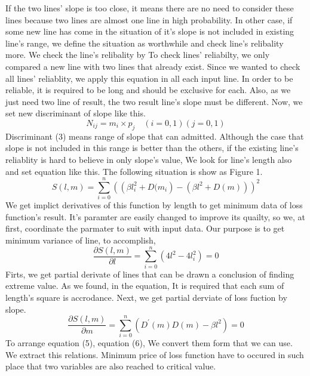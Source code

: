 \newline If the two lines’ slope is too close, it means there are no need to consider these lines because two lines are almost one line in high probability. In other case, if some new line has come in the situation of it's slope is not included in existing line's range, we define the situation as worthwhile and check line's relibality more. We check the line's relibality by To check lines’ reliabilty, we only compared a new line with two lines that already exist. Since we wanted to check all lines’ reliablity, we apply this equation in all each input line. \newline
In order to be reliable, it is required to be long and should be exclusive for each. Also, as we just need two line of result, the two result line's slope must be different. Now, we set new discriminant of slope like this. 
\begin{equation}
{N}_{ij} = {m}_{i} \times {p}_{j} \quad (i=0,1)(j=0,1)
\end{equation}
Discriminant (3) means range of slope that can admitted. Although the case that slope is not included in this range is better than the others, if the existing line's reliablity is hard to believe in only slope's value, We look for line's length also and set equation like this. The following situation is show as Figure 1. 
\begin{equation}
\mathit{S\left(l,m\right) = \sum_{i=0}^{n}{(\left(\beta{l}_{i}^{2} + D({m}_{i}\right) - (\beta{l}^{2} + D\left(m \right)))}^{2}}
\end{equation}
We get implict derivatives of this function by length to get minimum data of loss function's result. It's paramter are easily changed to improve its quailty, so we, at first, coordinate the parmater to suit with input data. Our purpose is to get minimum variance of line, to accomplish,  
\begin{equation}
\mathit{\frac{\partial S\left(l,m\right)}{\partial l} = \sum_{i=0}^{n}{\left(4{l}^{2}-4{{l}_{i}^{2}}\right)} = 0} 
\end{equation}
Firts, we get partial derivate of lines that can be drawn a conclusion of finding extreme value. As we found, in the equation, It is required that each sum of length's square is accrodance. Next, we get partial derviate of loss fuction by slope.
\begin{equation}
\mathit{\frac{\partial S\left(l,m\right)}{\partial m} = \sum_{i=0}^{n}{({D}^{\prime}(m)D(m) - \beta{l}^{2})} = 0}
\end{equation}
To arrange equation (5), equation (6), We convert them form that we can use. We extract this relations. Minimum price of loss function have to occured in such place that two variables are also reached to critical value.
